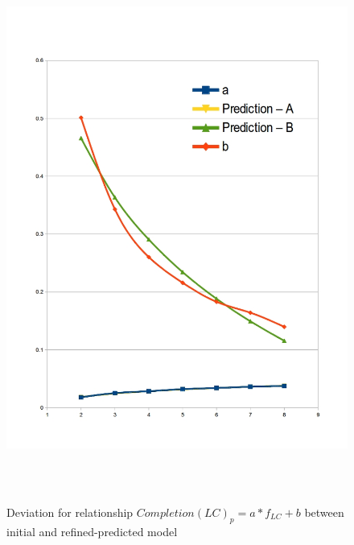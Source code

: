 \documentclass[diploma]{Styles/softlab-thesis}
\begin{document}
\begin{figure}[ht!]
\begin{center}
\includegraphics[width=160mm, height=180mm]{images/refined-prediction-LC.jpg}
\caption{Deviation for relationship $Completion(LC)_{p}=a*f_{LC}+b$ between initial and refined-predicted model \label{overflow}}
\end{center}
\end{figure}
\end{document}
